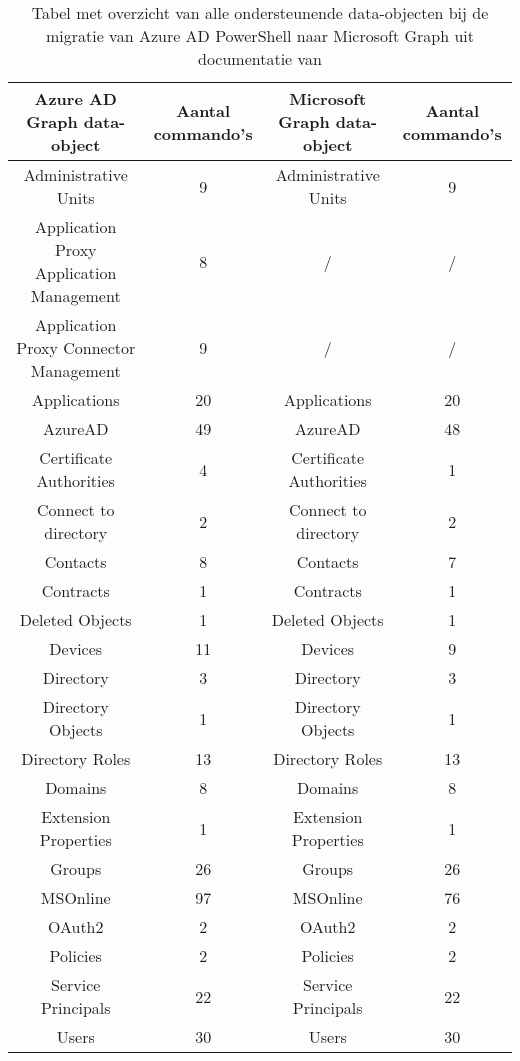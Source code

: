 \begin{table}
    \centering
    \begin{adjustbox}{max width=\textwidth}
    \begin{tabular}{ |c|c||c|c| } 
        \hline
        \textbf{Azure AD Graph data-object} & \textbf{Aantal commando's} & \textbf{Microsoft Graph data-object} & \textbf{Aantal commando's} \\
        \hline
        Administrative Units & 9 & Administrative Units & 9 \\ 
        Application Proxy Application Management & 8 & / & / \\
        Application Proxy Connector Management & 9 & / & / \\
        Applications & 20 & Applications & 20 \\ 
        AzureAD & 49 & AzureAD & 48 \\ 
        Certificate Authorities & 4 & Certificate Authorities & 1 \\ 
        Connect to directory & 2 & Connect to directory & 2 \\ 
        Contacts & 8 & Contacts & 7 \\ 
        Contracts & 1 & Contracts & 1 \\ 
        Deleted Objects & 1 & Deleted Objects & 1 \\ 
        Devices & 11 & Devices & 9 \\    
        Directory & 3 & Directory & 3 \\
        Directory Objects & 1 & Directory Objects & 1 \\ 
        Directory Roles & 13 & Directory Roles & 13 \\ 
        Domains & 8 & Domains & 8 \\ 
        Extension Properties & 1 & Extension Properties & 1 \\ 
        Groups & 26 & Groups & 26 \\ 
        MSOnline & 97 & MSOnline & 76 \\
        OAuth2 & 2 & OAuth2 & 2 \\ 
        Policies & 2 & Policies & 2 \\ 
        Service Principals & 22 & Service Principals & 22 \\ 
        Users & 30 & Users & 30 \\ 
        \hline
    \end{tabular}
    \end{adjustbox}
    \caption[Tabel migratie Azure AD data-objecten naar Microsoft Graph]{Tabel met overzicht van alle ondersteunende data-objecten bij de migratie van Azure \ac{AD} PowerShell naar Microsoft Graph uit documentatie van \textcite{Microsoft2023l}}
    \label{AADMSG}
\end{table}

